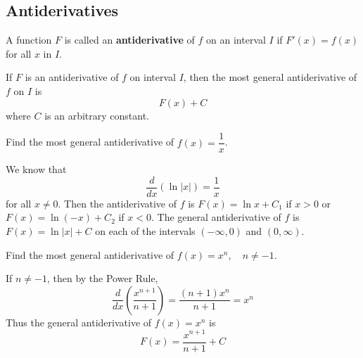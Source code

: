 \subsection{Antiderivatives}

\begin{definition}
    A function \(F\) is called an \textbf{antiderivative} of \(f\) on an
    interval \(I\) if \(F'(x)=f(x)\) for all \(x\) in \(I\).
\end{definition}
\begin{theorem}
    If \(F\) is an antiderivative of \(f\) on interval \(I\), then the most
    general antiderivative of \(f\) on \(I\) is
    \[F(x)+C\]
    where \(C\) is an arbitrary constant.
\end{theorem}
\begin{problem}
    Find the most general antiderivative of \(f(x)=\dfrac{1}{x}\).
\end{problem}
\begin{solution}
    We know that
    \[\frac{d}{dx}(\ln |x|)=\frac{1}{x}\]
    for all \(x\neq 0\).
    Then the antiderivative of \(f\) is \(F(x)=\ln x+C_1\) if \(x>0\)
    or \(F(x)=\ln(-x)+C_2\) if \(x<0\).
    The general antiderivative of \(f\) is \(F(x)=\ln |x|+C\) on each of the
    intervals \((-\infty,0)\) and \((0,\infty)\).
\end{solution}
\begin{problem}
    Find the most general antiderivative of \(f(x)=x^n,\quad n\neq -1\).
\end{problem}
\begin{solution}
    If \(n\neq -1\), then by the Power Rule,
    \[\frac{d}{dx}\left(\frac{x^{n+1}}{n+1}\right)=\frac{(n+1)x^n}{n+1}=x^n\]
    Thus the general antiderivative of \(f(x)=x^n\) is
    \[F(x)=\frac{x^{n+1}}{n+1}+C\]
\end{solution}